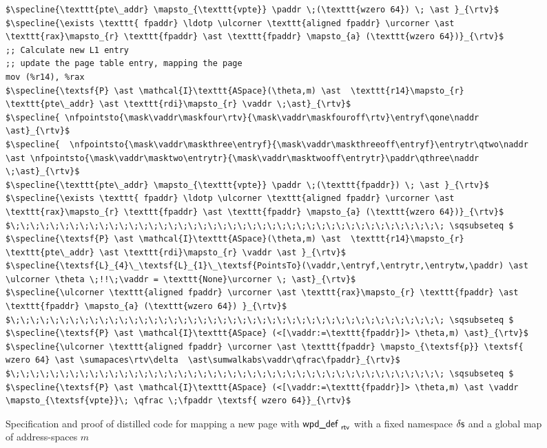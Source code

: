 \begin{figure}
\begin{lstlisting}
$\specline{\texttt{pte\_addr} \mapsto_{\texttt{vpte}} \paddr \;(\texttt{wzero 64}) \; \ast }_{\rtv}$
$\specline{\exists \texttt{ fpaddr} \ldotp \ulcorner \texttt{aligned fpaddr} \urcorner \ast \texttt{rax}\mapsto_{r} \texttt{fpaddr} \ast \texttt{fpaddr} \mapsto_{a} (\texttt{wzero 64})}_{\rtv}$
;; Calculate new L1 entry
;; update the page table entry, mapping the page
mov (%r14), %rax
$\specline{\textsf{P} \ast \mathcal{I}\texttt{ASpace}(\theta,m) \ast  \texttt{r14}\mapsto_{r} \texttt{pte\_addr} \ast \texttt{rdi}\mapsto_{r} \vaddr \;\ast}_{\rtv}$
$\specline{ \nfpointsto{\mask\vaddr\maskfour\rtv}{\mask\vaddr\maskfouroff\rtv}\entryf\qone\naddr \ast}_{\rtv}$ 
$\specline{  \nfpointsto{\mask\vaddr\maskthree\entryf}{\mask\vaddr\maskthreeoff\entryf}\entrytr\qtwo\naddr \ast \nfpointsto{\mask\vaddr\masktwo\entrytr}{\mask\vaddr\masktwooff\entrytr}\paddr\qthree\naddr \;\ast}_{\rtv}$
$\specline{\texttt{pte\_addr} \mapsto_{\texttt{vpte}} \paddr \;(\texttt{fpaddr}) \; \ast }_{\rtv}$
$\specline{\exists \texttt{ fpaddr} \ldotp \ulcorner \texttt{aligned fpaddr} \urcorner \ast \texttt{rax}\mapsto_{r} \texttt{fpaddr} \ast \texttt{fpaddr} \mapsto_{a} (\texttt{wzero 64})}_{\rtv}$
$\;\;\;\;\;\;\;\;\;\;\;\;\;\;\;\;\;\;\;\;\;\;\;\;\;\;\;\;\;\;\;\;\;\;\;\;\;\;\;\;\;\;\;\; \sqsubseteq $
$\specline{\textsf{P} \ast \mathcal{I}\texttt{ASpace}(\theta,m) \ast  \texttt{r14}\mapsto_{r} \texttt{pte\_addr} \ast \texttt{rdi}\mapsto_{r} \vaddr \ast }_{\rtv}$
$\specline{\textsf{L}_{4}\_\textsf{L}_{1}\_\textsf{PointsTo}(\vaddr,\entryf,\entrytr,\entrytw,\paddr) \ast \ulcorner \theta \;!!\;\vaddr = \texttt{None}\urcorner \; \ast}_{\rtv}$
$\specline{\ulcorner \texttt{aligned fpaddr} \urcorner \ast \texttt{rax}\mapsto_{r} \texttt{fpaddr} \ast \texttt{fpaddr} \mapsto_{a} (\texttt{wzero 64}) }_{\rtv}$
$\;\;\;\;\;\;\;\;\;\;\;\;\;\;\;\;\;\;\;\;\;\;\;\;\;\;\;\;\;\;\;\;\;\;\;\;\;\;\;\;\;\;\;\; \sqsubseteq $
$\specline{\textsf{P} \ast \mathcal{I}\texttt{ASpace} (<[\vaddr:=\texttt{fpaddr}]> \theta,m) \ast}_{\rtv}$
$\specline{\ulcorner \texttt{aligned fpaddr} \urcorner \ast \texttt{fpaddr} \mapsto_{\textsf{p}} \textsf{ wzero 64} \ast \sumapaces\rtv\delta  \ast\sumwalkabs\vaddr\qfrac\fpaddr}_{\rtv}$
$\;\;\;\;\;\;\;\;\;\;\;\;\;\;\;\;\;\;\;\;\;\;\;\;\;\;\;\;\;\;\;\;\;\;\;\;\;\;\;\;\;\;\;\; \sqsubseteq $
$\specline{\textsf{P} \ast \mathcal{I}\texttt{ASpace} (<[\vaddr:=\texttt{fpaddr}]> \theta,m) \ast \vaddr \mapsto_{\textsf{vpte}}\; \qfrac \;\fpaddr \textsf{ wzero 64}}_{\rtv}$
\end{lstlisting}
  \caption{Specification and proof of distilled code for mapping a new page with $\textsf{wpd\_def }_{\textsf{rtv}}$ with a fixed namespace $\delta\textsf{s}$ and a global map of address-spaces $m$  }
\label{fig:mapping_code}
\end{figure}
